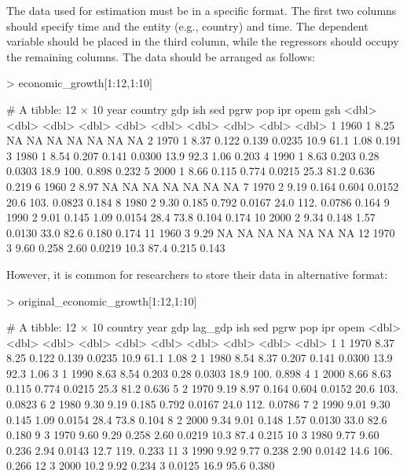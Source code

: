\documentclass[a4paper]{article}
\begin{document}
The data used for estimation must be in a specific format. The first two columns should specify time and the entity (e.g., country) and time. The dependent variable should be placed in the third column, while the regressors should occupy the remaining columns. The data should be arranged as follows:
\begin{Schunk}
\begin{Sinput}
> economic_growth[1:12,1:10]
\end{Sinput}
\begin{Soutput}
# A tibble: 12 × 10
    year country   gdp    ish    sed    pgrw   pop   ipr    opem    gsh
   <dbl>   <dbl> <dbl>  <dbl>  <dbl>   <dbl> <dbl> <dbl>   <dbl>  <dbl>
 1  1960       1  8.25 NA     NA     NA       NA    NA   NA      NA    
 2  1970       1  8.37  0.122  0.139  0.0235  10.9  61.1  1.08    0.191
 3  1980       1  8.54  0.207  0.141  0.0300  13.9  92.3  1.06    0.203
 4  1990       1  8.63  0.203  0.28   0.0303  18.9 100.   0.898   0.232
 5  2000       1  8.66  0.115  0.774  0.0215  25.3  81.2  0.636   0.219
 6  1960       2  8.97 NA     NA     NA       NA    NA   NA      NA    
 7  1970       2  9.19  0.164  0.604  0.0152  20.6 103.   0.0823  0.184
 8  1980       2  9.30  0.185  0.792  0.0167  24.0 112.   0.0786  0.164
 9  1990       2  9.01  0.145  1.09   0.0154  28.4  73.8  0.104   0.174
10  2000       2  9.34  0.148  1.57   0.0130  33.0  82.6  0.180   0.174
11  1960       3  9.29 NA     NA     NA       NA    NA   NA      NA    
12  1970       3  9.60  0.258  2.60   0.0219  10.3  87.4  0.215   0.143
\end{Soutput}
\end{Schunk}
However, it is common for researchers to store their data in alternative format:
\begin{Schunk}
\begin{Sinput}
> original_economic_growth[1:12,1:10]
\end{Sinput}
\begin{Soutput}
# A tibble: 12 × 10
   country  year   gdp lag_gdp   ish   sed   pgrw   pop   ipr   opem
     <dbl> <dbl> <dbl>   <dbl> <dbl> <dbl>  <dbl> <dbl> <dbl>  <dbl>
 1       1  1970  8.37    8.25 0.122 0.139 0.0235  10.9  61.1 1.08  
 2       1  1980  8.54    8.37 0.207 0.141 0.0300  13.9  92.3 1.06  
 3       1  1990  8.63    8.54 0.203 0.28  0.0303  18.9 100.  0.898 
 4       1  2000  8.66    8.63 0.115 0.774 0.0215  25.3  81.2 0.636 
 5       2  1970  9.19    8.97 0.164 0.604 0.0152  20.6 103.  0.0823
 6       2  1980  9.30    9.19 0.185 0.792 0.0167  24.0 112.  0.0786
 7       2  1990  9.01    9.30 0.145 1.09  0.0154  28.4  73.8 0.104 
 8       2  2000  9.34    9.01 0.148 1.57  0.0130  33.0  82.6 0.180 
 9       3  1970  9.60    9.29 0.258 2.60  0.0219  10.3  87.4 0.215 
10       3  1980  9.77    9.60 0.236 2.94  0.0143  12.7 119.  0.233 
11       3  1990  9.92    9.77 0.238 2.90  0.0142  14.6 106.  0.266 
12       3  2000 10.2     9.92 0.234 3     0.0125  16.9  95.6 0.380 
\end{Soutput}
\end{Schunk}
\end{document}

